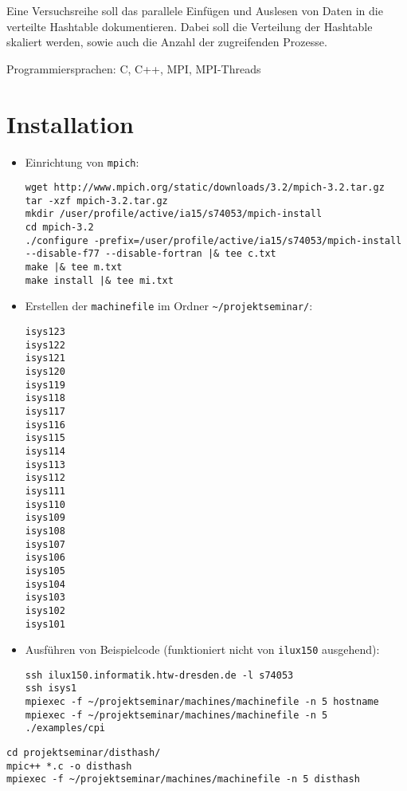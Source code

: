 \documentclass{scrreprt}
\begin{document}
Eine Versuchsreihe soll das parallele Einfügen und Auslesen von Daten in die verteilte Hashtable dokumentieren. Dabei soll die Verteilung der Hashtable skaliert werden, sowie auch die Anzahl der zugreifenden Prozesse.

Programmiersprachen: C, C++, MPI, MPI-Threads


\chapter{Installation}

\begin{itemize}
\item Einrichtung von \verb|mpich|:
\begin{lstlisting}
wget http://www.mpich.org/static/downloads/3.2/mpich-3.2.tar.gz
tar -xzf mpich-3.2.tar.gz
mkdir /user/profile/active/ia15/s74053/mpich-install
cd mpich-3.2
./configure -prefix=/user/profile/active/ia15/s74053/mpich-install --disable-f77 --disable-fortran |& tee c.txt
make |& tee m.txt
make install |& tee mi.txt
\end{lstlisting}

\item Erstellen der \verb|machinefile| im Ordner \verb|~/projektseminar/|:
\begin{lstlisting}
isys123
isys122
isys121
isys120
isys119
isys118
isys117
isys116
isys115
isys114
isys113
isys112
isys111
isys110
isys109
isys108
isys107
isys106
isys105
isys104
isys103
isys102
isys101
\end{lstlisting}
\item Ausführen von Beispielcode (funktioniert nicht von \verb|ilux150| ausgehend):
\begin{lstlisting}
ssh ilux150.informatik.htw-dresden.de -l s74053
ssh isys1
mpiexec -f ~/projektseminar/machines/machinefile -n 5 hostname
mpiexec -f ~/projektseminar/machines/machinefile -n 5 ./examples/cpi
\end{lstlisting}
\end{itemize}

\begin{lstlisting}
cd projektseminar/disthash/
mpic++ *.c -o disthash
mpiexec -f ~/projektseminar/machines/machinefile -n 5 disthash
\end{lstlisting}
\end{document}
